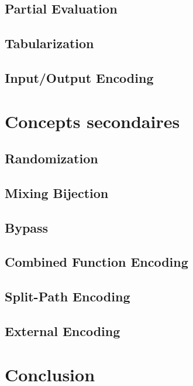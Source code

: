 \documentclass{beamer}
\begin{document}
\subsection{Partial Evaluation}

\subsection{Tabularization}

\subsection{Input/Output Encoding}

\section{Concepts secondaires}

\subsection{Randomization}

\subsection{Mixing Bijection}

\subsection{Bypass}

\subsection{Combined Function Encoding}

\subsection{Split-Path Encoding}

\subsection{External Encoding}

\section{Conclusion}
\end{document}
